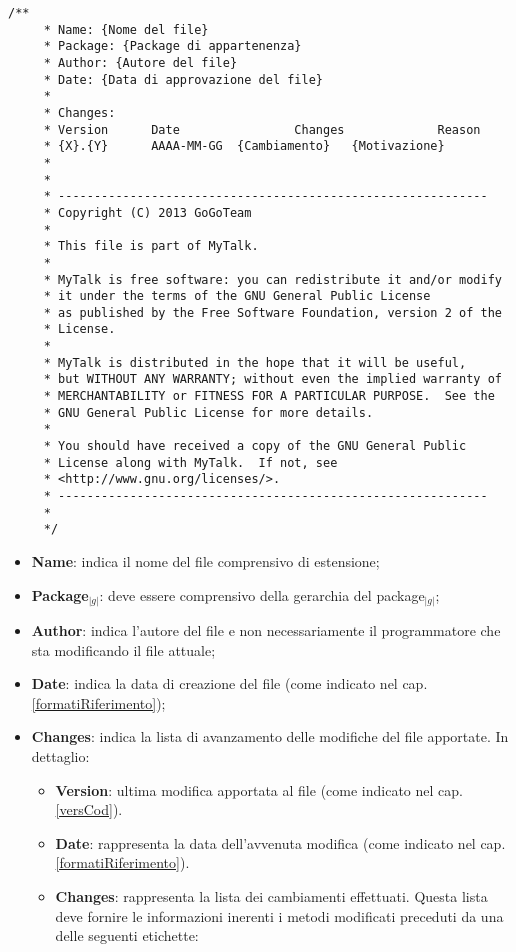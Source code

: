 {{		{ \footnotesize
		\begin{lstlisting}[basicstyle=\ttfamily]
	/**
	 * Name: {Nome del file}
	 * Package: {Package di appartenenza}
	 * Author: {Autore del file}
	 * Date: {Data di approvazione del file}
	 *
	 * Changes:
	 * Version		Date				Changes				Reason 
	 * {X}.{Y}		AAAA-MM-GG	{Cambiamento}	{Motivazione}
	 *
	 *
	 * ------------------------------------------------------------
	 * Copyright (C) 2013 GoGoTeam
	 * 
	 * This file is part of MyTalk.
	 * 
	 * MyTalk is free software: you can redistribute it and/or modify
	 * it under the terms of the GNU General Public License
	 * as published by the Free Software Foundation, version 2 of the
	 * License.
	 * 
	 * MyTalk is distributed in the hope that it will be useful,
	 * but WITHOUT ANY WARRANTY; without even the implied warranty of
	 * MERCHANTABILITY or FITNESS FOR A PARTICULAR PURPOSE.  See the
	 * GNU General Public License for more details.
	 * 
	 * You should have received a copy of the GNU General Public 
	 * License along with MyTalk.  If not, see 
	 * <http://www.gnu.org/licenses/>.
	 * ------------------------------------------------------------
	 *
	 */
		\end{lstlisting}
}
		\begin{itemize}
			\item \textbf{Name}: indica il nome del file comprensivo di estensione;
			\item \textbf{Package}$_{|g|}$: deve essere comprensivo della gerarchia del package$_{|g|}$;
			\item \textbf{Author}: indica l'autore del file e non necessariamente il programmatore che sta modificando il file attuale;
			\item \textbf{Date}: indica la data di creazione del file (come indicato nel cap. \ref{formatiRiferimento});
			\item \textbf{Changes}: indica la lista di avanzamento delle  modifiche del file apportate. In dettaglio:
			\begin{itemize}
				\item \textbf{Version}: ultima modifica apportata al file (come indicato nel cap. \ref{versCod}).
				\item \textbf{Date}: rappresenta la data dell'avvenuta modifica (come indicato nel cap. \ref{formatiRiferimento}).
				\item \textbf{Changes}: rappresenta la lista dei cambiamenti effettuati. Questa lista deve fornire le informazioni inerenti i metodi modificati preceduti da una delle seguenti etichette:

\end{itemize}
\end{itemize}}}
